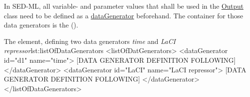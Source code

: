 \label{sec:listOfDataGenerators}

In SED-ML, all variable- and parameter values that shall be used in the \hyperref[class:output]{Output} class need to be defined as a \hyperref[class:dataGenerator]{dataGenerator} beforehand. The container for those data generators is the  (). 
%

%
\begin{myXmlLst}{The  element, defining two data generators \emph{time} and \emph{LaCI repressor}}{lst:listOfDataGenerators}
<listOfDatGenerators>
 <dataGenerator id="d1" name="time">
  [DATA GENERATOR DEFINITION FOLLOWING]
 </dataGenerator>
 <dataGenerator id="LaCI" name="LaCI repressor">
  [DATA GENERATOR DEFINITION FOLLOWING]
 </dataGenerator>
</listOfDataGenerators>
\end{myXmlLst}
%



